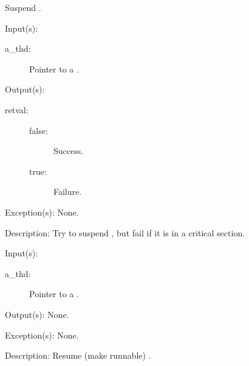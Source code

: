 \begin{capi}
\begin{capilist}
		Suspend .
	\end{capilist}
\label{thd_trysuspend}
	\begin{capilist}
	\item[Input(s): ]
		\begin{description}\item[]
		\item[a\_thd: ]
			Pointer to a .
		\end{description}
	\item[Output(s): ]
		\begin{description}\item[]
		\item[retval: ]
			\begin{description}\item[]
			\item[false: ]
				Success.
			\item[true: ]
				Failure.
			\end{description}
		\end{description}
	\item[Exception(s): ] None.
	\item[Description: ]
		Try to suspend , but fail if it is in a critical
		section.
	\end{capilist}
\label{thd_resume}
	\begin{capilist}
	\item[Input(s): ]
		\begin{description}\item[]
		\item[a\_thd: ]
			Pointer to a \classname{thd}.
		\end{description}
	\item[Output(s): ] None.
	\item[Exception(s): ] None.
	\item[Description: ]
		Resume (make runnable) \classname{a\_thd}.
	\end{capilist}
\end{capi}
